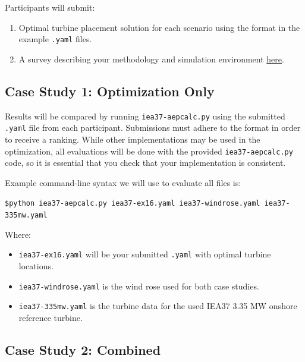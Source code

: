 \documentclass{article}
\begin{document}
    Participants will submit:
    \begin{enumerate}
        \item Optimal turbine placement solution for each scenario using the format in the example \texttt{.yaml} files. 
        \item A survey describing your methodology and simulation environment \href{https://goo.gl/forms/2tX3eJ0rlnElmTgR2}{here}.
    \end{enumerate}

    \subsection{Case Study 1: Optimization Only}

        Results will be compared by running \texttt{iea37-aepcalc.py} using the submitted \texttt{.yaml} file from each participant.
        Submissions must adhere to the format in order to receive a ranking.
        While other implementations may be used in the optimization, all evaluations will be done with the provided \texttt{iea37-aepcalc.py} code, so it is essential that you check that your implementation is consistent.

        Example command-line syntax we will use to evaluate all files is:
        
        \vspace{0.5em}
        \texttt{\$python iea37-aepcalc.py iea37-ex16.yaml iea37-windrose.yaml iea37-335mw.yaml}
        \vspace{0.5em}
        
        \noindent Where: 
        \begin{itemize}[noitemsep,topsep=0pt,parsep=0pt,partopsep=0pt]
            \item \texttt{iea37-ex16.yaml} will be your submitted \texttt{.yaml} with optimal turbine locations.
            \item \texttt{iea37-windrose.yaml} is the wind rose used for both case studies.
            \item \texttt{iea37-335mw.yaml} is the turbine data for the used IEA37 3.35 MW onshore reference turbine.
        \end{itemize}

    \subsection{Case Study 2: Combined}
\end{document}
